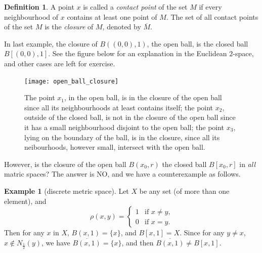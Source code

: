 \documentclass[a4paper,12pt]{article}
\theoremstyle{definition}
\newtheorem{defn}[thm]{Definition}
\newtheorem{expl}[thm]{Example}
\theoremstyle{remark}
\begin{document}
\begin{defn}
  A point $x$ is called a \emph{contact point} of the set $M$ if every neighbourhood of $x$ contains at least one point of $M$. The set of all contact points of the set $M$ is the \emph{closure} of $M$, denoted by $\overline{M}$.
\end{defn}

In last example, the closure of $B((0,0), 1)$, the open ball, is the closed ball $B[(0,0), 1]$. See the figure below for an explanation in the Euclidean $2$-space, and other cases are left for exercise.
\begin{figure}[h]
  \centering
  \texttt{[image: open\_ball\_closure]}
  \caption{The point $x_1$, in the open ball, is in the closure of the open ball since all its neighbourhoods at least contains itself; the point $x_2$, outside of the closed ball, is not in the closure of the open ball since it has a small neighbourhood disjoint to the open ball; the point $x_3$, lying on the boundary of the ball, is in the closure, since all its neibourhoods, however small, intersect with the open ball.}
\end{figure}

However, is the closure of the open ball $B(x_0, r)$ the closed ball $B[x_0, r]$ in \emph{all} matric spaces? The answer is NO, and we have a counterexample as follows.
\begin{expl}[discrete metric space]
  Let $X$ be any set (of more than one element), and
  \begin{equation*}
    \rho(x, y) =
    \begin{cases}
      1 & \text{if $x \neq y$,} \\
      0 & \text{if $x = y$.}
    \end{cases}
  \end{equation*}
  Then for any $x$ in $X$, $B(x, 1) = \{ x \}$, and $B[x, 1] = X$. Since for any $y \neq x$, $x \not\in N_{\frac{1}{2}}(y)$, we have $\overline{B(x, 1)} = \{ x \}$, and then $\overline{B(x, 1)} \neq B[x, 1]$.
\end{expl}
\end{document}
